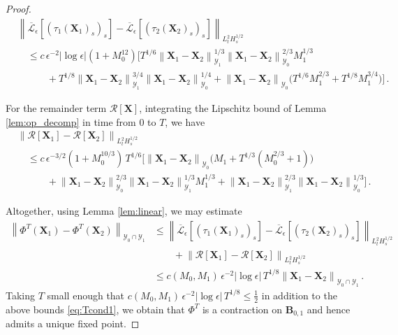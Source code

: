 \documentclass[11pt,reqno]{amsart}
\newcommand{\X}{\bm{X}}
\newcommand{\abs}[1]{\left\lvert #1 \right\rvert}
\newcommand{\norm}[1]{\left\lVert #1 \right\rVert}
\newcommand{\mc}[1]{\mathcal{#1}}
\numberwithin{equation}{section}
\theoremstyle{definition}
\begin{document}
\begin{proof}
\begin{equation}
\begin{aligned}
  &\norm{\overline{\mc{L}}_\epsilon[(\tau_1(\X_1)_s)_s]-\overline{\mc{L}}_\epsilon[(\tau_2(\X_2)_s)_s]}_{L^2_tH^{1/2}_s} \\
  &\quad\le c\,\epsilon^{-2}\abs{\log\epsilon}(1+M_0^{12})\bigg[T^{1/6}\norm{\X_1-\X_2}_{\mc{Y}_1}^{1/3}\norm{\X_1-\X_2}_{\mc{Y}_0}^{2/3}M_1^{1/3} \\
  &\quad\qquad + T^{1/8}\norm{\X_1-\X_2}_{\mc{Y}_1}^{3/4}\norm{\X_1-\X_2}_{\mc{Y}_0}^{1/4} + \norm{\X_1-\X_2}_{\mc{Y}_0}\big(T^{1/6}M_1^{2/3} + T^{1/8}M_1^{3/4}\big)  \bigg]\,.
\end{aligned}
\end{equation}


For the remainder term $\mc{R}[\X]$, integrating the Lipschitz bound of Lemma \ref{lem:op_decomp} in time from 0 to $T$, we have
  \begin{equation}
  \begin{aligned}
  &\norm{\mc{R}[\X_1]-\mc{R}[\X_2]}_{L^2_tH^{1/2}_s}\\
  &\quad \le c\,\epsilon^{-3/2}(1+M_0^{10/3})\,T^{1/6}\bigg[\norm{\X_1-\X_2}_{\mc{Y}_0}\big(M_1 + T^{1/3}(M_0^{2/3}+1)\big)\\
  &\qquad\quad + \norm{\X_1-\X_2}_{\mc{Y}_0}^{2/3}\norm{\X_1-\X_2}_{\mc{Y}_1}^{1/3}M_1^{1/3} 
  + \norm{\X_1-\X_2}_{\mc{Y}_1}^{2/3}\norm{\X_1-\X_2}_{\mc{Y}_0}^{1/3}\bigg]\,.
  \end{aligned}
  \end{equation}


Altogether, using Lemma \ref{lem:linear}, we may estimate 
\begin{equation}
\begin{aligned}
  \norm{\Phi^T(\X_1)-\Phi^T(\X_2)}_{\mc{Y}_0\cap\mc{Y}_1}
  &\le \norm{\overline{\mc{L}}_\epsilon[(\tau_1(\X_1)_s)_s]-\overline{\mc{L}}_\epsilon[(\tau_2(\X_2)_s)_s]}_{L^2_tH^{1/2}_s}\\
  &\qquad+ \norm{\mc{R}[\X_1]-\mc{R}[\X_2]}_{L^2_tH^{1/2}_s}\\
  &\le c(M_0,M_1)\,\epsilon^{-2}\abs{\log\epsilon}\,T^{1/8}\norm{\X_1-\X_2}_{\mc{Y}_0\cap\mc{Y}_1}\,.
\end{aligned}
\end{equation}
Taking $T$ small enough that $c(M_0,M_1)\,\epsilon^{-2}\abs{\log\epsilon}\,T^{1/8}\le \frac{1}{2}$ in addition to the above bounds \eqref{eq:Tcond1}, we obtain that $\Phi^T$ is a contraction on $\bm{B}_{0,1}$ and hence admits a unique fixed point.
%
%
%
\end{proof}
\end{document}
